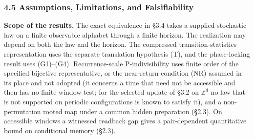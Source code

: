 \documentclass[
]{article}
\begin{document}
\hypertarget{assumptions-limitations-and-falsifiability}{%
\subsubsection{4.5 Assumptions, Limitations, and
Falsifiability}\label{assumptions-limitations-and-falsifiability}}

\textbf{Scope of the results.} The exact equivalence in §3.4 takes a
supplied stochastic law on a finite observable alphabet through a finite
horizon. The realization may depend on both the law and the horizon. The
compressed transition-statistics representation uses the separate
translation hypothesis (T), and the phase-locking result uses
(G1)--(G4). Recurrence-scale P-indivisibility uses finite order of the
specified bijective representative, or the near-return condition (NR)
assumed in its place and not adopted (it concerns a time that need not
be accessible and then has no finite-window test; for the selected
update of §3.2 on \(\mathbb{Z}^d\) no law that is not supported on
periodic configurations is known to satisfy it), and a non-permutation
rooted map under a common hidden preparation (§2.3). On accessible
windows a witnessed readback gap gives a pair-dependent quantitative
bound on conditional memory (§2.3).
\end{document}
